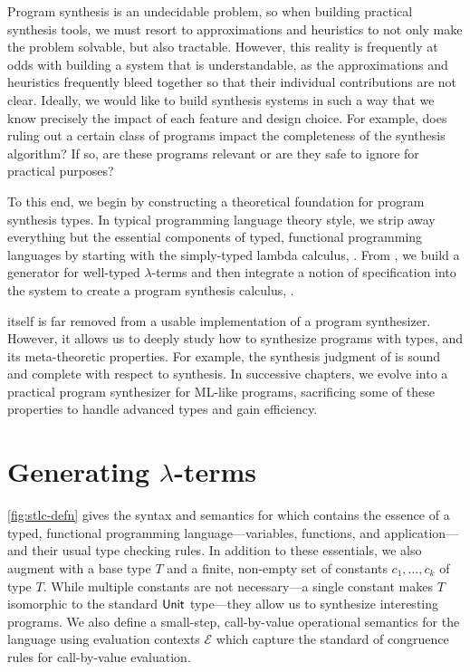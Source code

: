 Program synthesis is an undecidable problem, so when building practical synthesis tools, we must resort to approximations and heuristics to not only make the problem solvable, but also tractable.
However, this reality is frequently at odds with building a system that is understandable, as the approximations and heuristics frequently bleed together so that their individual contributions are not clear.
Ideally, we would like to build synthesis systems in such a way that we know precisely the impact of each feature and design choice.
For example, does ruling out a certain class of programs impact the completeness of the synthesis algorithm?
If so, are these programs relevant or are they safe to ignore for practical purposes?

To this end, we begin by constructing a theoretical foundation for program synthesis types.
In typical programming language theory style, we strip away everything but the essential components of typed, functional programming languages by starting with the simply-typed lambda calculus, \stlc{}.
From \stlc{}, we build a generator for well-typed $λ$-terms and then integrate a notion of specification into the system to create a program synthesis calculus, \lsyn{}.

\lsyn{} itself is far removed from a usable implementation of a program synthesizer.
However, it allows us to deeply study how to synthesize programs with types, and its meta-theoretic properties.
For example, the synthesis judgment of \lsyn{} is sound and complete with respect to synthesis.
In successive chapters, we evolve \lsyn{} into a practical program synthesizer for ML-like programs, sacrificing some of these properties to handle advanced types and gain efficiency.

\section{Generating \texorpdfstring{$λ$}{λ}-terms}
\label{sec:generating-lambda-terms}



\autoref{fig:stlc-defn} gives the syntax and semantics for \stlc{} which contains the essence of a typed, functional programming language---variables, functions, and application---and their usual type checking rules.
In addition to these essentials, we also augment \stlc{} with a base type $T$ and a finite, non-empty set of constants $c_1, …, c_k$ of type $T$.
While multiple constants are not necessary---a single constant makes $T$ isomorphic to the standard $\mathsf{Unit}$ type---they allow us to synthesize interesting programs.
We also define a small-step, call-by-value operational semantics for the language using evaluation contexts $ℰ$ which capture the standard of congruence rules for call-by-value evaluation.


